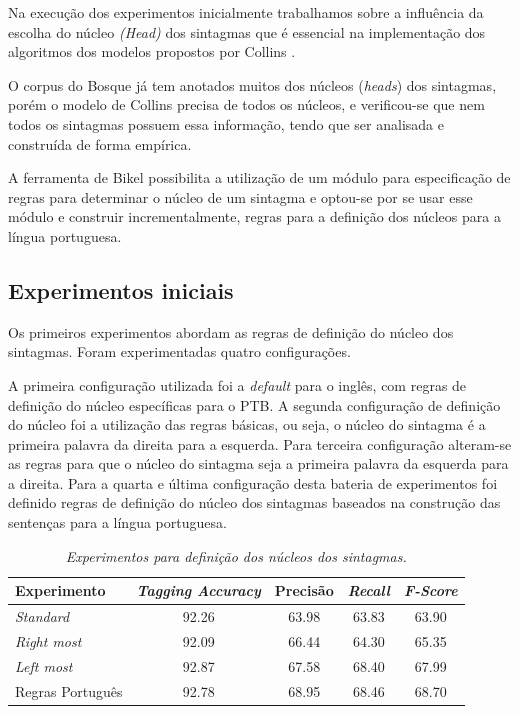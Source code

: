 Na execução dos experimentos inicialmente trabalhamos sobre a influência da escolha do núcleo \emph{(Head)} dos sintagmas que é essencial na implementação dos algoritmos dos modelos propostos por Collins \cite{collins99}.

O corpus do Bosque já tem anotados muitos dos núcleos (\emph{heads}) dos sintagmas, porém o modelo de Collins precisa de todos os núcleos, e verificou-se que nem todos os sintagmas possuem essa informação, tendo que ser analisada e construída de forma empírica.

A ferramenta de Bikel possibilita a utilização de um módulo para especificação de regras para determinar o núcleo de um sintagma e optou-se por se usar esse módulo e construir incrementalmente, regras para a definição dos núcleos para a língua portuguesa.

\subsection{Experimentos iniciais}
\label{sec:configuracoes}

Os primeiros experimentos abordam as regras de definição do núcleo dos sintagmas. Foram experimentadas quatro configurações.

A primeira configuração utilizada foi a \emph{default} para o inglês, com regras de definição do núcleo específicas para o PTB. A segunda configuração de definição do núcleo foi a utilização das regras básicas, ou seja, o núcleo do sintagma é a primeira palavra da direita para a esquerda. Para terceira configuração alteram-se as regras para que o núcleo do sintagma seja a primeira palavra da esquerda para a direita. Para a quarta e última configuração desta bateria de experimentos foi definido regras de definição do núcleo dos sintagmas baseados na construção das sentenças para a língua portuguesa.

\begin{table}[H]
\centering
   \footnotesize
\caption{\it Experimentos para definição dos núcleos dos sintagmas.}
	
	\begin{tabular}{|l|c|c|c|c|}
		\hline
		\textbf{Experimento} &  \textbf{\emph{Tagging Accuracy}} & \textbf{Precisão} & \textbf{\emph{Recall}} & \textbf{\emph{F-Score}} \\
		\hline
		\emph{Standard} & 92.26 & 63.98 & 63.83 & 63.90\\
		\hline		
		\emph{Right most} & 92.09 & 66.44 & 64.30 & 65.35\\
		\hline		
		\emph{Left most} & 92.87 & 67.58 & 68.40 & 67.99\\
		\hline		
		Regras Português & 92.78 & 68.95 & 68.46 & 68.70\\
		\hline
	\end{tabular}
	\label{tab:primeiro_experimento}
\end{table}


